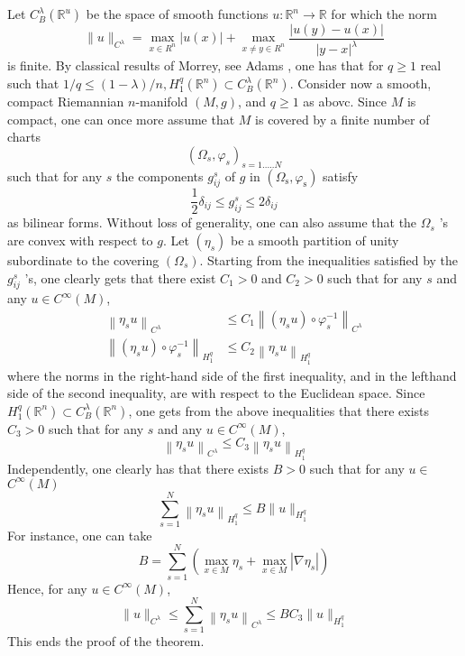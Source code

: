 \documentclass[12pt,hyperref,a4paper,UTF8]{ctexart}
\begin{document}
\begin{Proof}
    Let $C_B^\lambda \left(\mathbb{R}^u\right)$ be the space of smooth functions $u: \mathbb{R}^n \rightarrow \mathbb{R}$ for which the norm
$$
\|u\|_{C^\lambda}=\max _{x \in R^n}|u(x)|+\max _{x \neq y \in R^n} \frac{|u(y)-u(x)|}{|y-x|^\lambda}
$$
is finite. By classical results of Morrey, see Adams \cite{A}, one has that for $q \geq 1$ real such that $1 / q \leq(1-\lambda) / n, H_1^q\left(\mathbb{R}^n\right) \subset C_B^\lambda\left(\mathbb{R}^n\right)$. Consider now a smooth, compact Riemannian $n$-manifold $(M, g)$, and $q \geq 1$ as abovc. Since $M$ is compact, one can once more assume that $M$ is covered by a finite number of charts
$$
\left(\Omega_s, \varphi_s\right)_{s=1 \ldots . . N}
$$
such that for any $s$ the components $g_{i j}^s$ of $g$ in $\left(\Omega_{\mathrm{s}}, \varphi_{\mathrm{s}}\right)$ satisfy
$$
\frac{1}{2} \delta_{i j} \leq g_{i j}^s \leq 2 \delta_{i j}
$$
as bilinear forms. Without loss of generality, one can also assume that the $\Omega_s$ 's are convex with respect to $g$. Let $\left(\eta_s\right)$ be a smooth partition of unity subordinate to the
covering $\left(\Omega_s\right)$. Starting from the inequalities satisfied by the $g_{i j}^s$ 's, one clearly gets that there exist $C_1>0$ and $C_2>0$ such that for any $s$ and any $u \in C^{\infty}(M)$,
$$
\begin{aligned}
\left\|\eta_s u\right\|_{C^\lambda} & \leq C_1\left\|\left(\eta_s u\right) \circ \varphi_s^{-1}\right\|_{C^\lambda} \\
\left\|\left(\eta_s u\right) \circ \varphi_s^{-1}\right\|_{H_1^q} & \leq C_2\left\|\eta_s u\right\|_{H_1^q}
\end{aligned}
$$
where the norms in the right-hand side of the first inequality, and in the lefthand side of the second inequality, are with respect to the Euclidean space. Since $H_1^q\left(\mathbb{R}^n\right) \subset C_B^\lambda\left(\mathbb{R}^n\right)$, one gets from the above inequalities that there exists $C_3>0$ such that for any $s$ and any $u \in C^{\infty}(M)$,
$$
\left\|\eta_s u\right\|_{C^{\lambda }} \leq C_3\left\|\eta_s u\right\|_{H_1^q}
$$
Independently, one clearly has that there exists $B>0$ such that for any $u \in$ $C^{\infty}(M)$
$$
\sum_{s=1}^N\left\|\eta_s u\right\|_{H_1^q} \leq B\|u\|_{H_1^q}
$$
For instance, one can take
$$
B=\sum_{s=1}^N\left(\max _{x \in M} \eta_s+\max _{x \in M}\left|\nabla \eta_s\right|\right)
$$
Hence, for any $u \in C^{\infty}(M)$,
$$
\|u\|_{C^\lambda} \leq \sum_{s=1}^N\left\|\eta_s u\right\|_{C^\lambda} \leq B C_3\|u\|_{H_1^q}
$$
This ends the proof of the theorem.
\end{Proof}
\end{document}

